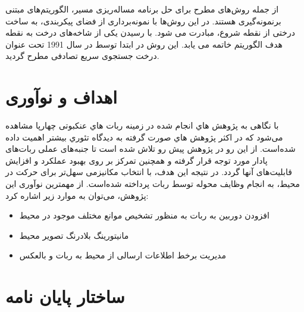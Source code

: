 از جمله روش‌های مطرح برای حل برنامه مساله‌ریزی مسیر،
الگوریتم‌های مبتنی برنمونه‌گیری هستند. در این روش‌ها با نمونه‌برداری از فضای پیکربندی، به ساخت درختی از نقطه شروع، مبادرت می شود. با رسیدن یکی از شاخه‌های درخت به نقطه هدف الگوریتم خاتمه می یابد.
 این روش در ابتدا توسط
در سال 1991 تحت عنوان درخت جستجوی سریع تصادفی
مطرح گردید.




\section{اهداف و نوآوری}

با نگاهی به پژوهش هاي انجام شده در زمينه ربات هاي عنکبوتی چهارپا مشاهده می‌شود كه در اكثر پژوهش هاي صورت گرفته به ديدگاه تئوري بيشتر اهمیت داده شده‌است. از این رو در پژوهش پيش رو تلاش شده است تا جنبه‌های عملی ربات‌‌های پادار مورد توجه قرار گرفته و همچنین تمرکز بر روی بهبود عملکرد و افزایش قابلیت‌های آنها گردد. در نتیجه این هدف، با انتخاب مکانیزمی سهل‌تر برای حرکت در محیط، به انجام وظایف محوله توسط ربات پرداخته شده‌است.
از مهمترین نوآوری این پژوهش، می‌توان به موارد زیر اشاره کرد:
\begin{itemize}
	\item
	افزودن دوربین به ربات به منظور تشخیص موانع مختلف موجود در محیط
	\item
	مانیتورینگ بلادرنگ
	\noindent\unskip{}
	تصویر محیط
	\item
	مدیریت برخط
	\noindent\unskip{}
	اطلاعات ارسالی از محیط به ربات و بالعکس
\end{itemize}


\section{ساختار پایان نامه}

